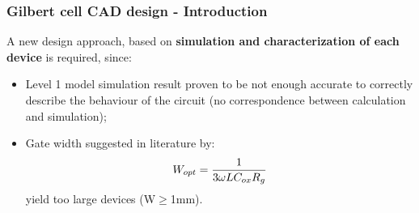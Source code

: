 \begin{frame} %
\tableofcontents[currentsubsection]
\end{frame}

\begin{frame}
	\frametitle{Gilbert cell CAD design - Introduction}
	A new design approach, based on \textbf{simulation and characterization of each device} is required, since:
	\begin{itemize}
		\item Level 1 model simulation result proven to be not enough accurate to correctly describe the behaviour of the circuit (no correspondence between calculation and simulation);
		\item Gate width suggested in literature by:
		\begin{equation}
			W_{opt}=\frac{1}{3\omega L C_{ox} R_{g}} \notag
		\end{equation}
		yield too large devices (W$\geq$1mm).
	\end{itemize}
\end{frame}


